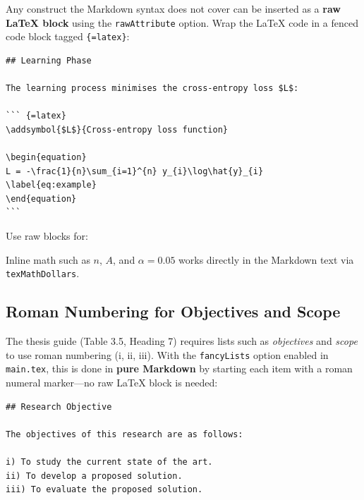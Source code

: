 Any construct the Markdown syntax does not cover can be inserted as a \textbf{raw \LaTeX{} block} using the \texttt{rawAttribute} option. Wrap the \LaTeX{} code in a fenced code block tagged \texttt{\{=latex\}}:

\begin{verbatim}
## Learning Phase

The learning process minimises the cross-entropy loss $L$:

``` {=latex}
\addsymbol{$L$}{Cross-entropy loss function}

\begin{equation}
L = -\frac{1}{n}\sum_{i=1}^{n} y_{i}\log\hat{y}_{i}
\label{eq:example}
\end{equation}
```
\end{verbatim}

Use raw blocks for:


Inline math such as $n$, $A$, and $\alpha = 0.05$ works directly in the Markdown text via \texttt{texMathDollars}.

\subsection{Roman Numbering for Objectives and Scope}

The thesis guide (Table 3.5, Heading 7) requires lists such as \emph{objectives} and \emph{scope} to use roman numbering (i, ii, iii). With the \texttt{fancyLists} option enabled in \texttt{main.tex}, this is done in \textbf{pure Markdown} by starting each item with a roman numeral marker---no raw \LaTeX{} block is needed:

\begin{verbatim}
## Research Objective

The objectives of this research are as follows:

i) To study the current state of the art.
ii) To develop a proposed solution.
iii) To evaluate the proposed solution.
\end{verbatim}

